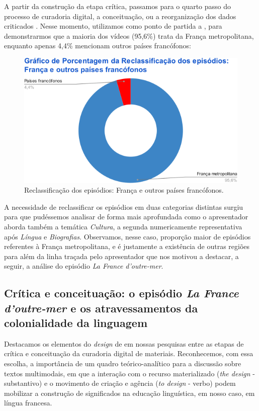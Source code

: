 \documentclass[portuguese]{textolivre}
\begin{document}
A partir da construção da etapa crítica, passamos para o quarto passo do processo de curadoria digital, a conceituação, ou a reorganização dos dados criticados \cite[p. 22]{deschaine_five_2015}. Nesse momento, utilizamos como ponto de partida a , para demonstrarmos que a maioria dos vídeos (95,6\%) trata da França metropolitana, enquanto apenas 4,4\% mencionam outros países francófonos:

\begin{figure}[h]
    \centering
    \begin{minipage}{.55\textwidth}
    \includegraphics[width=\linewidth]{Fig2.png}
    \caption{Reclassificação dos episódios: França e outros países francófonos.}
    \label{fig2}
    \end{minipage}
\end{figure}

A necessidade de reclassificar os episódios em duas categorias distintas surgiu para que pudéssemos analisar de forma mais aprofundada como o apresentador aborda também a temática \textit{Cultura}, a segunda numericamente representativa após \textit{Língua} e \textit{Biografias}. Observamos, nesse caso, proporção maior de episódios referentes à França metropolitana, e é justamente a existência de outras regiões para além da linha traçada pelo apresentador que nos motivou a destacar, a seguir, a análise do episódio \textit{La France d’outre-mer}.

\subsection{Crítica e conceituação: o episódio \textit{La France d’outre-mer} e os atravessamentos da colonialidade da linguagem}\label{sec-fmt-manuscrito}
Destacamos os elementos do \textit{design} de \textcite{kalantzis_letramentos_2020} em nossas pesquisas entre as etapas de crítica e conceituação da curadoria digital de materiais. Reconhecemos, com essa escolha, a importância de um quadro teórico-analítico para a discussão sobre textos multimodais, em que a interação com o recurso materializado (\textit{the design} - substantivo) e o movimento de criação e agência (\textit{to design} - verbo) podem mobilizar a construção de significados na educação linguística, em nosso caso, em língua francesa.
\end{document}
